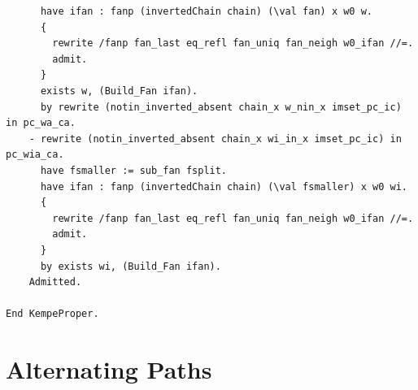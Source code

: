 \begin{verbatim}
      have ifan : fanp (invertedChain chain) (\val fan) x w0 w.
      {
        rewrite /fanp fan_last eq_refl fan_uniq fan_neigh w0_ifan //=.
        admit.
      }
      exists w, (Build_Fan ifan).
      by rewrite (notin_inverted_absent chain_x w_nin_x imset_pc_ic) in pc_wa_ca.
    - rewrite (notin_inverted_absent chain_x wi_in_x imset_pc_ic) in pc_wia_ca.
      have fsmaller := sub_fan fsplit.
      have ifan : fanp (invertedChain chain) (\val fsmaller) x w0 wi.
      {
        rewrite /fanp fan_last eq_refl fan_uniq fan_neigh w0_ifan //=.
        admit.
      }
      by exists wi, (Build_Fan ifan).
    Admitted.

End KempeProper.  
\end{verbatim}

\section{Alternating Paths}\label{apdx:alt}
